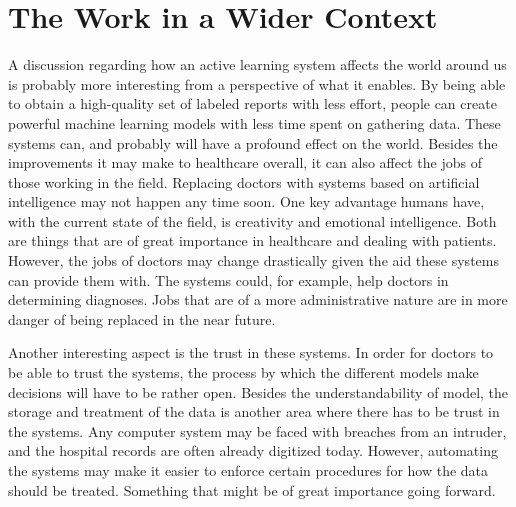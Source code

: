 \section{The Work in a Wider Context}

A discussion regarding how an active learning system affects the world around us is probably more interesting from a perspective of what it enables.
By being able to obtain a high-quality set of labeled reports with less effort, people can create powerful machine learning models with less time spent on gathering data.
These systems can, and probably will have a profound effect on the world.
Besides the improvements it may make to healthcare overall, it can also affect the jobs of those working in the field.
Replacing doctors with systems based on artificial intelligence may not happen any time soon.
One key advantage humans have, with the current state of the field, is creativity and emotional intelligence.
Both are things that are of great importance in healthcare and dealing with patients.
However, the jobs of doctors may change drastically given the aid these systems can provide them with.
The systems could, for example, help doctors in determining diagnoses.
Jobs that are of a more administrative nature are in more danger of being replaced in the near future.

Another interesting aspect is the trust in these systems.
In order for doctors to be able to trust the systems, the process by which the different models make decisions will have to be rather open.
Besides the understandability of model, the storage and treatment of the data is another area where there has to be trust in the systems.
Any computer system may be faced with breaches from an intruder, and the hospital records are often already digitized today.
However, automating the systems may make it easier to enforce certain procedures for how the data should be treated.
Something that might be of great importance going forward.